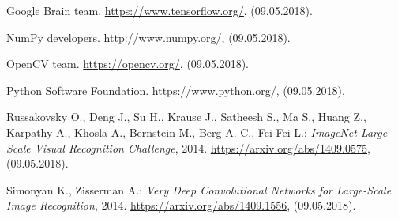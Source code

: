 \documentclass[a4paper]{article}
\begin{document}
\clearpage
\begin{thebibliography}{99}

 Google Brain team. \url{https://www.tensorflow.org/}, (09.05.2018).

 NumPy developers. \url{http://www.numpy.org/}, (09.05.2018).

 OpenCV team. \url{https://opencv.org/}, (09.05.2018).

 Python Software Foundation. \url{https://www.python.org/}, (09.05.2018).

Russakovsky O., Deng J., Su H., Krause J., Satheesh S., Ma S., Huang Z., Karpathy A., Khosla A., Bernstein M., Berg A. C., Fei-Fei L.: \textit{ImageNet Large Scale Visual Recognition Challenge}, 2014. 
\url{https://arxiv.org/abs/1409.0575}, (09.05.2018).

Simonyan K., Zisserman A.: \textit{Very Deep Convolutional Networks for Large-Scale Image Recognition}, 2014. \url{https://arxiv.org/abs/1409.1556}, (09.05.2018).

\end{thebibliography}
\end{document}

